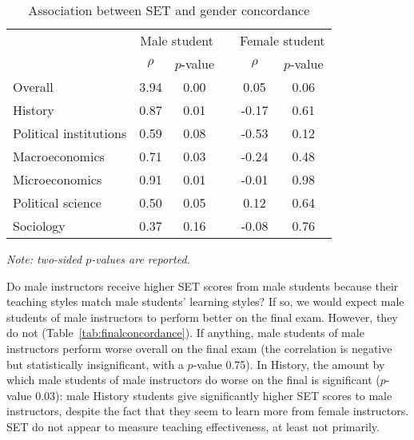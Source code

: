 \documentclass[12pt]{article}
\begin{document}
\begin{table}[htbp]
  \centering
  \footnotesize 
  \caption{Association between SET and gender concordance}
    \begin{tabular}{lccccc}
    \toprule 
          & \multicolumn{2}{c}{Male student}  &  & \multicolumn{2}{c}{Female student} \\
      & $\rho$  &  $p$-value &  & $\rho$  &  $p$-value    \\
   \midrule
      \quad  Overall                &  3.94       & 0.00 & &  0.05       & 0.06     \\
      \quad  History                &  0.87       & 0.01 & & -0.17       & 0.61     \\
      \quad  Political institutions &  0.59       & 0.08 & & -0.53       & 0.12     \\
      \quad  Macroeconomics         &  0.71       & 0.03 & & -0.24       & 0.48     \\
      \quad  Microeconomics         &  0.91       & 0.01 & &  -0.01      & 0.98     \\
      \quad  Political science     &  0.50       & 0.05 & &  0.12       & 0.64     \\
      \quad  Sociology              &  0.37       & 0.16 & & -0.08       & 0.76     \\
    \bottomrule
    \end{tabular}%
 \label{tab:genderconcordance}%
  
  \textit{Note: two-sided $p$-values are reported.}
\end{table}%
\normalsize

Do male instructors receive higher SET scores from male students because their 
teaching styles match male students' learning styles? 
If so, we would expect male students of male instructors to perform better on the final exam. 
However, they do not (Table~\ref{tab:finalconcordance}). 
If anything, male students of male instructors perform worse overall on the final exam (the correlation is negative but statistically insignificant, with a $p$-value 0.75). 
In History, the amount by which male students of male instructors do worse on the final
is significant ($p$-value 0.03):
male History students give significantly higher SET scores to male instructors, despite the fact that 
they seem to learn more from female instructors. 
SET do not appear to measure teaching effectiveness, at least not primarily.
\end{document}
